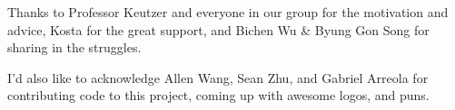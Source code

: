 Thanks to Professor Keutzer and everyone in our group for the motivation and advice, Kosta for the great support, and Bichen Wu \& Byung Gon Song for sharing in the struggles.

I'd also like to acknowledge Allen Wang, Sean Zhu, and Gabriel Arreola for contributing code to this project, coming up with awesome logos, and puns.

